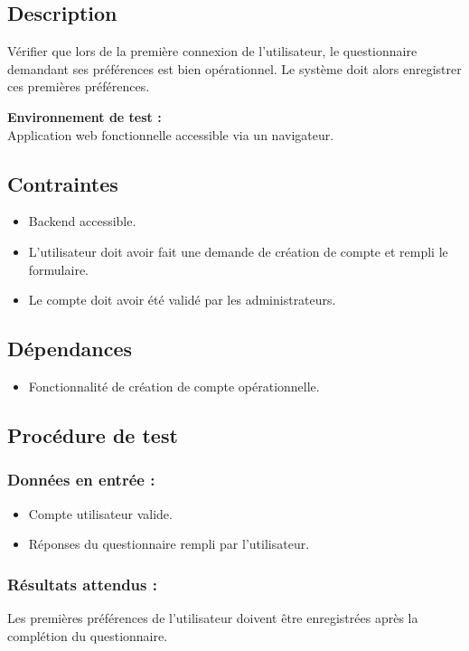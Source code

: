 \documentclass[a4paper,12pt]{report}
\begin{document}
\subsection*{Description}
Vérifier que lors de la première connexion de l’utilisateur, le questionnaire demandant ses préférences est bien opérationnel. Le système doit alors enregistrer ces premières préférences.

\textbf{Environnement de test : }\\
Application web fonctionnelle accessible via un navigateur.
\subsection*{Contraintes}
\begin{itemize}
    \item Backend accessible.
    \item L’utilisateur doit avoir fait une demande de création de compte et rempli le formulaire.
    \item Le compte doit avoir été validé par les administrateurs.
\end{itemize}

\subsection*{Dépendances}
\begin{itemize}
    \item Fonctionnalité de création de compte opérationnelle.
\end{itemize}

\subsection*{Procédure de test}
\subsubsection{Données en entrée :}
\begin{itemize}
    \item Compte utilisateur valide.
    \item Réponses du questionnaire rempli par l’utilisateur.
\end{itemize}
\subsubsection{Résultats attendus :}
Les premières préférences de l’utilisateur doivent être enregistrées après la complétion du questionnaire.
\end{document}
